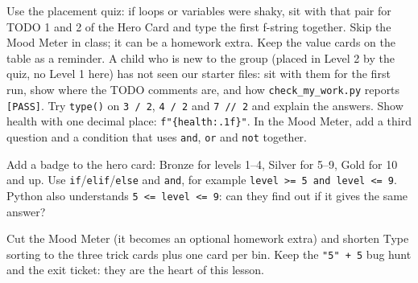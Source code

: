 \begin{differentiation}
\supportpath Use the placement quiz: if loops or variables were shaky, sit with that pair for TODO 1 and 2 of the Hero Card and type the first f-string
together. Skip the Mood Meter in class; it can be a homework extra. Keep the value cards on the table as a reminder.
A child who is new to the group (placed in Level 2 by the quiz, no Level 1 here) has not seen our starter files: sit with them for
the first run, show where the TODO comments are, and how \texttt{check\_my\_work.py} reports \texttt{[PASS]}.
\extensionpath Try \texttt{type()} on \texttt{3 / 2}, \texttt{4 / 2} and \texttt{7 // 2} and explain the answers. Show health with one decimal place:
\texttt{f"\{health:.1f\}"}. In the Mood Meter, add a third question and a condition that uses \texttt{and}, \texttt{or} and \texttt{not} together.
\end{differentiation}

\begin{stretchchallenge}
Add a badge to the hero card: Bronze for levels 1--4, Silver for 5--9, Gold for 10 and up. Use \texttt{if}/\texttt{elif}/\texttt{else} and
\texttt{and}, for example \texttt{level >= 5 and level <= 9}. Python also understands \texttt{5 <= level <= 9}: can they find out if it gives the same answer?
\end{stretchchallenge}

\begin{teachernote}
Cut the Mood Meter (it becomes an optional homework extra) and shorten Type sorting to the three trick cards plus one card per bin.
Keep the \texttt{"5" + 5} bug hunt and the exit ticket: they are the heart of this lesson.
\end{teachernote}
